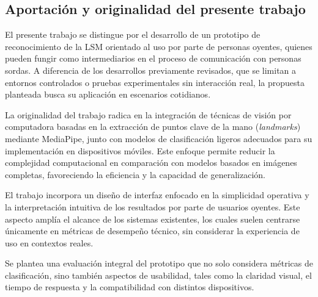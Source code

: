 	\subsection{Aportación y originalidad del presente trabajo}
	
	El presente trabajo se distingue por el desarrollo de un prototipo de reconocimiento de la LSM orientado al uso por parte de personas oyentes, quienes pueden fungir como intermediarios en el proceso de comunicación con personas sordas. A diferencia de los desarrollos previamente revisados, que se limitan a entornos controlados o pruebas experimentales sin interacción real, la propuesta planteada busca su aplicación en escenarios cotidianos.
	
	La originalidad del trabajo radica en la integración de técnicas de visión por computadora basadas en la extracción de puntos clave de la mano (\textit{landmarks}) mediante MediaPipe, junto con modelos de clasificación ligeros adecuados para su implementación en dispositivos móviles. Este enfoque permite reducir la complejidad computacional en comparación con modelos basados en imágenes completas, favoreciendo la eficiencia y la capacidad de generalización.
	
	El trabajo incorpora un diseño de interfaz enfocado en la simplicidad operativa y la interpretación intuitiva de los resultados por parte de usuarios oyentes. Este aspecto amplía el alcance de los sistemas existentes, los cuales suelen centrarse únicamente en métricas de desempeño técnico, sin considerar la experiencia de uso en contextos reales.
	
	Se plantea una evaluación integral del prototipo que no solo considera métricas de clasificación, sino también aspectos de usabilidad, tales como la claridad visual, el tiempo de respuesta y la compatibilidad con distintos dispositivos.
	
